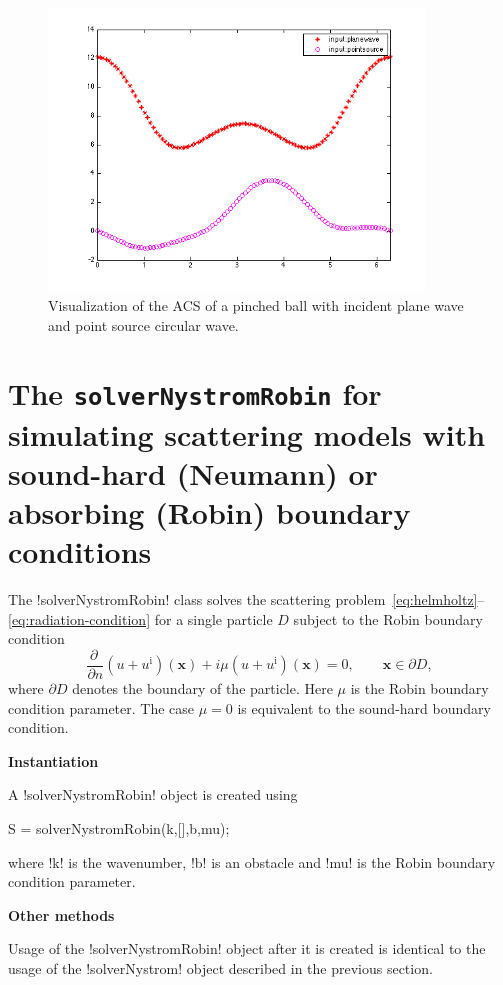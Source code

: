 \documentclass[12pt,letterpaper,final]{article}
\newcommand{\x}{\boldsymbol{x}}
\newcommand{\surface}{\partial D}
\newcommand{\techheading}[1]{%
    \par\vspace{-0.3\parskip}\noindent\hspace{-1cm}\textbf{#1}%
    \par\vspace{-0.5\parskip}\noindent\nopagebreak\ignorespaces}
\begin{document}
\begin{figure}
\centering
\includegraphics[width=10cm]{solver_pinched_ball.png}
\caption{\label{fig:solver}
Visualization of the ACS of a pinched ball with incident plane
wave  and point source circular wave.
}
\end{figure}

\section{The \texttt{solverNystromRobin} for simulating scattering models
with sound-hard (Neumann) or absorbing (Robin) boundary conditions }

The !solverNystromRobin! class solves the scattering 
problem~\eqref{eq:helmholtz}--\eqref{eq:radiation-condition} for a single particle $D$ subject
to the Robin boundary condition
\begin{displaymath}
\frac{\partial\ }{\partial n} (u+u^\mathrm{i})(\x) + i \mu (u+u^\mathrm{i})(\x) = 0, \qquad \x \in \surface,
\end{displaymath}
where $\surface$ denotes the boundary of the particle.
Here $\mu$ is the Robin boundary condition parameter.
The case $\mu=0$ is equivalent to the sound-hard boundary condition.

\techheading{Instantiation}
A !solverNystromRobin! object is created using
\begin{matlab}
S = solverNystromRobin(k,[],b,mu);
\end{matlab}
where !k! is the wavenumber, !b! is an obstacle and
!mu! is the Robin boundary condition parameter.

\techheading{Other methods}
Usage of the !solverNystromRobin! object after it is created is identical to
the usage of the !solverNystrom! object described in the previous section.
\end{document}
